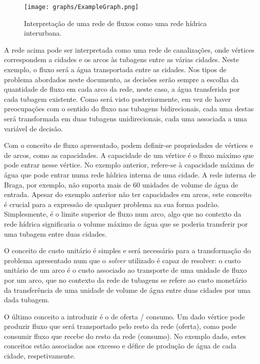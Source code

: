 \documentclass[12pt, a4paper, titlepage]{article}
\begin{document}
\begin{figure}[H]
    \centering
    \texttt{[image: graphs/ExampleGraph.png]}
    \caption{Interpretação de uma rede de fluxos como uma rede hídrica interurbana.}
    \label{example-graph}
\end{figure}

A rede acima pode ser interpretada como uma rede de canalizações, onde vértices correspondem a
cidades e os arcos às tubagens entre as várias cidades. Neste exemplo, o fluxo será a água
transportada entre as cidades. Nos tipos de problema abordados neste documento, as decisões serão
sempre a escolha da quantidade de fluxo em cada arco da rede, neste caso, a água transferida por
cada tubagem existente. Como será visto posteriormente, em vez de haver preocupações com o sentido
do fluxo nas tubagens bidirecionais, cada uma destas será transformada em duas tubagens
unidirecionais, cada uma associada a uma variável de decisão.

Com o conceito de fluxo apresentado, podem definir-se propriedades de vértices e de arcos, como as
capacidades. A capacidade de um vértice é o fluxo máximo que pode entrar nesse vértice. No exemplo
anterior, refere-se à capacidade máxima de água que pode entrar numa rede hídrica interna de uma
cidade. A rede interna de Braga, por exemplo, não suporta mais de 60 unidades de volume de água de
entrada. Apesar do exemplo anterior não ter capacidades em arcos, este conceito é crucial para a
expressão de qualquer problema na sua forma padrão. Simplesmente, é o limite superior de fluxo num
arco, algo que no contexto da rede hídrica significaria o volume máximo de água que se poderia
transferir por uma tubagem entre duas cidades.

O conceito de custo unitário é simples e será necessário para a transformação do problema
apresentado num que o \emph{solver} utilizado é capaz de resolver: o custo unitário de um arco é o
custo associado ao transporte de uma unidade de fluxo por um arco, que no contexto da rede de
tubagens se refere ao custo monetário da transferência de uma unidade de volume de água entre duas
cidades por uma dada tubagem.

O último conceito a introduzir é o de oferta / consumo. Um dado vértice pode produzir fluxo que será
transportado pelo resto da rede (oferta), como pode consumir fluxo que recebe do resto da rede
(consumo). No exemplo dado, estes conceitos estão associados aos excesso e défice de produção de
água de cada cidade, respetivamente.
\end{document}
